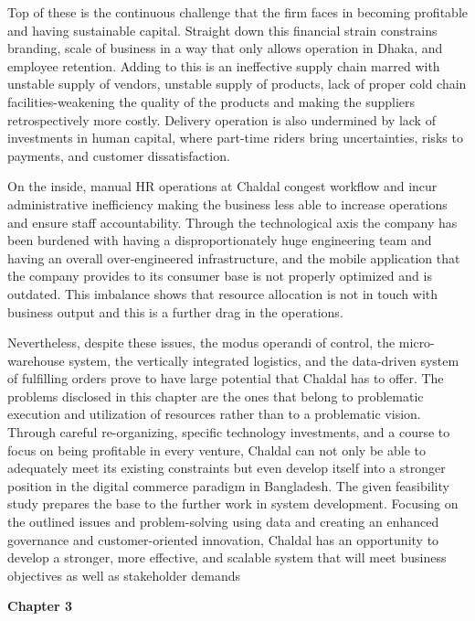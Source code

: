 \documentclass[12pt,a4paper]{article}
\begin{document}
Top of these is the continuous challenge that the firm faces in becoming profitable and having sustainable capital. Straight down this financial strain constrains branding, scale of business in a way that only allows operation in Dhaka, and employee retention. Adding to this is an ineffective supply chain marred with unstable supply of vendors, unstable supply of products, lack of proper cold chain facilities-weakening the quality of the products and making the suppliers retrospectively more costly. Delivery operation is also undermined by lack of investments in human capital, where part-time riders bring uncertainties, risks to payments, and customer dissatisfaction.

On the inside, manual HR operations at Chaldal congest workflow and incur administrative inefficiency making the business less able to increase operations and ensure staff accountability. Through the technological axis the company has been burdened with having a disproportionately huge engineering team and having an overall over-engineered infrastructure, and the mobile application that the company provides to its consumer base is not properly optimized and is outdated. This imbalance shows that resource allocation is not in touch with business output and this is a further drag in the operations.

Nevertheless, despite these issues, the modus operandi of control, the micro-warehouse system, the vertically integrated logistics, and the data-driven system of fulfilling orders prove to have large potential that Chaldal has to offer. The problems disclosed in this chapter are the ones that belong to problematic execution and utilization of resources rather than to a problematic vision. Through careful re-organizing, specific technology investments, and a course to focus on being profitable in every venture, Chaldal can not only be able to adequately meet its existing constraints but even develop itself into a stronger position in the digital commerce paradigm in Bangladesh.
The given feasibility study prepares the base to the further work in system development. Focusing on the outlined issues and problem-solving using data and creating an enhanced governance and customer-oriented innovation, Chaldal has an opportunity to develop a stronger, more effective, and scalable system that will meet business objectives as well as stakeholder demands

\clearpage

{\Large\bfseries\color{RoyalBlue}Chapter 3}
\vspace{0.8em}
\end{document}
